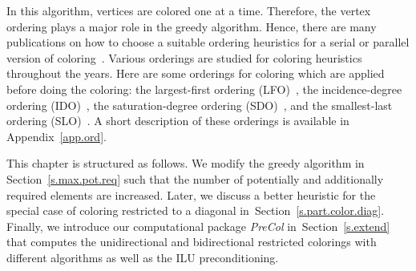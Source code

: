 \documentclass[12pt, twoside,a4paper,toc=bibliography]{scrbook}
\newcommand{\secref}[1]{Section~\protect\ref{#1}}
\newcommand{\appref}[1]{Appendix~\protect\ref{#1}}
\begin{document}
In this algorithm, vertices are colored one at a time.
Therefore, the vertex ordering plays a major role in the greedy algorithm.
Hence, there are many publications on how to choose
a suitable ordering heuristics for a serial or parallel version of
coloring~\cite{ordering1,ordering2,ordering3}.
Various orderings are studied for coloring heuristics
throughout the years. Here are some orderings for coloring which are applied before doing the coloring:
the largest-first ordering (LFO)~\cite{LFO}, the incidence-degree ordering (IDO)~\cite{IDO},
the saturation-degree ordering (SDO)~\cite{SDO}, and the smallest-last ordering (SLO)~\cite{ordering1}.
A short description of these orderings is available in \appref{app.ord}.

This chapter is structured as follows.
We modify the greedy algorithm in \secref{s.max.pot.req}
such that the number of potentially and additionally required elements are increased.
Later, we discuss a better heuristic for
the special case of coloring restricted to a diagonal in~\secref{s.part.color.diag}.
Finally, we introduce our computational package \textit{PreCol} 
in~\secref{s.extend} that computes the 
unidirectional and bidirectional restricted colorings with different algorithms
as well as the ILU preconditioning. 
\end{document}
